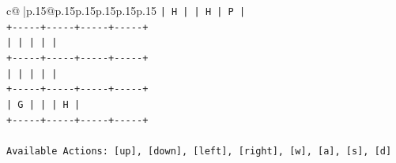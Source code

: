 \documentclass{article}
\begin{document}
{\begin{supertabular}{c@{$\;$}|p{.15\linewidth}@{}p{.15\linewidth}p{.15\linewidth}p{.15\linewidth}p{.15\linewidth}p{.15\linewidth}}
{{{\texttt{|  H  |     |  H  |  P  |} \\
\texttt{+{-}{-}{-}{-}{-}+{-}{-}{-}{-}{-}+{-}{-}{-}{-}{-}+{-}{-}{-}{-}{-}+} \\
\texttt{|     |     |     |     |} \\
\texttt{+{-}{-}{-}{-}{-}+{-}{-}{-}{-}{-}+{-}{-}{-}{-}{-}+{-}{-}{-}{-}{-}+} \\
\texttt{|     |     |     |     |} \\
\texttt{+{-}{-}{-}{-}{-}+{-}{-}{-}{-}{-}+{-}{-}{-}{-}{-}+{-}{-}{-}{-}{-}+} \\
\texttt{|  G  |     |     |  H  |} \\
\texttt{+{-}{-}{-}{-}{-}+{-}{-}{-}{-}{-}+{-}{-}{-}{-}{-}+{-}{-}{-}{-}{-}+} \\
\\ 
\texttt{Available Actions: {[}up{]}, {[}down{]}, {[}left{]}, {[}right{]}, {[}w{]}, {[}a{]}, {[}s{]}, {[}d{]}} \\
            }
        }
    }
     \\ \\


\end{supertabular}}
\end{document}
